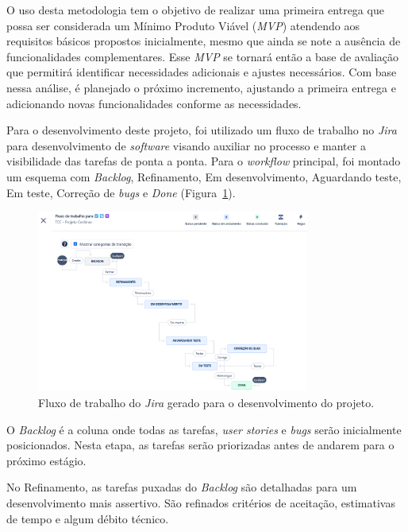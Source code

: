 O uso desta metodologia tem o objetivo de realizar uma primeira entrega que possa ser considerada um 
Mínimo Produto Viável (\textit{MVP}) atendendo aos requisitos básicos propostos inicialmente, mesmo que ainda 
se note a ausência de funcionalidades complementares. Esse \textit{MVP} se tornará então a base de avaliação que 
permitirá identificar necessidades adicionais e ajustes necessários. Com base nessa análise, é planejado 
o próximo incremento, ajustando a primeira entrega e adicionando novas funcionalidades conforme as necessidades.

Para o desenvolvimento deste projeto, foi utilizado um fluxo de trabalho no \textit{Jira} para desenvolvimento de \textit{software} visando 
auxiliar no processo e manter a visibilidade das tarefas de ponta a ponta. Para o \textit{workflow} principal, 
foi montado um esquema com \textit{Backlog}, Refinamento, Em desenvolvimento, Aguardando teste, Em teste, 
Correção de \textit{bugs} e \textit{Done} (Figura~\ref{fig:fluxoJira}).

\begin{figure}[htb]
    \centering
    \includegraphics[width=0.8\textwidth]{imagens/fluxoJira.png}
    \caption{Fluxo de trabalho do \textit{Jira} gerado para o desenvolvimento do projeto.}
    \label{fig:fluxoJira}
\end{figure} 

O \textit{Backlog} é a coluna onde todas as tarefas, \textit{user stories} e \textit{bugs} serão inicialmente 
posicionados. Nesta etapa, as tarefas serão priorizadas antes de andarem para o próximo estágio.

No Refinamento, as tarefas puxadas do \textit{Backlog} são detalhadas para um desenvolvimento 
mais assertivo. São refinados critérios de aceitação, estimativas de tempo e algum débito técnico.

